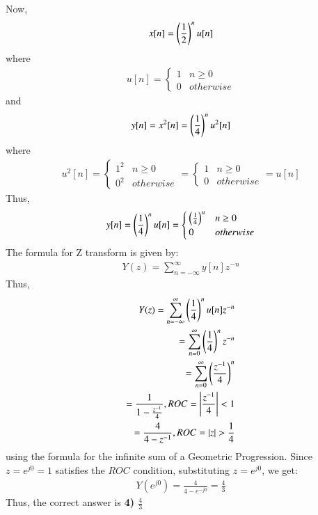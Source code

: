 \documentclass[journal,12pt,twocolumn]{IEEEtran}
\begin{document}
Now,
\begin{align}
    x[n] = \left(\frac{1}{2}\right)^n u[n] 
    \end{align}
    where
    \begin{align}
    u[n] = 
    \begin{cases}
    1 & n\geq0\\
    0 & otherwise
    \end{cases}
\end{align}
and 
\begin{align}
    y[n] = x^2[n] = \left(\frac{1}{4}\right)^nu^2[n]
\end{align}
where
\begin{align}
    u^2[n] = 
    \begin{cases}
    1^2 & n\geq 0\\
    0^2 & otherwise
    \end{cases}
    =
    \begin{cases}
    1 & n\geq0\\
    0 & otherwise
    \end{cases}
     = u[n]
\end{align}
Thus,
\begin{align}
    y[n] = \left(\frac{1}{4}\right)^nu[n] = \begin{cases}
    \left(\frac{1}{4}\right)^n & n\geq0\\
    0 & otherwise
    \end{cases}
\end{align}
The formula for Z transform is given by:
\begin{align}
    Y(z) = \sum_{n = -\infty}^{\infty} y[n]z^{-n}
\end{align}
Thus, 
\begin{align}
    Y(z) = \sum_{n = -\infty}^{\infty} \left(\frac{1}{4}\right)^nu[n]z^{-n}\\
     =  \sum_{n = 0}^{\infty} \left(\frac{1}{4}\right)^nz^{-n}\\
      = \sum_{n = 0}^{\infty} \left(\frac{z^{-1}}{4}\right)^n\\
       = \frac{1}{1 - \frac{z^{-1}}{4}}, ROC = \left\vert\frac{z^{-1}}{4}\right\vert < 1\\
       = \frac{4}{4 - z^{-1}} , ROC = \left\vert z\right\vert > \frac{1}{4}
\end{align}
using the formula for the infinite sum of a Geometric Progression. Since $z = e^{j0} = 1$ satisfies the $ROC$ condition, substituting $z = e^{j0}$, we get:
\begin{align}
    Y(e^{j0}) = \frac{4}{4-e^{-j0}} = \frac{4}{3}
\end{align}
Thus, the correct answer is \textbf{4) $\frac{4}{3}$}
\end{document}
